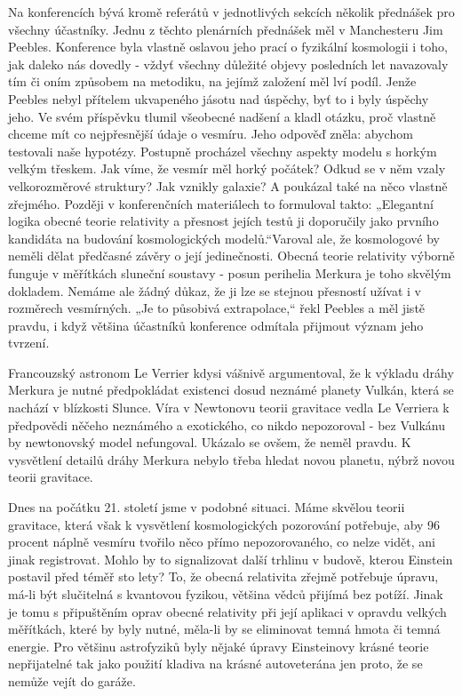   Na konferencích bývá kromě referátů v jednotlivých sekcích několik přednášek pro všechny
  účastníky. Jednu z těchto plenárních přednášek měl v Manchesteru Jim Peebles. Konference byla
  vlastně oslavou jeho prací o fyzikální kosmologii i toho, jak daleko nás dovedly - vždyť všechny
  důležité objevy posledních let navazovaly tím či oním způsobem na metodiku, na jejímž založení měl
  lví podíl. Jenže Peebles nebyl přítelem ukvapeného jásotu nad úspěchy, byť to i byly úspěchy jeho.
  Ve svém příspěvku tlumil všeobecné nadšení a kladl otázku, proč vlastně chceme mít co nejpřesnější
  údaje o vesmíru. Jeho odpověď zněla: abychom testovali naše hypotézy. Postupně procházel všechny
  aspekty modelu s horkým velkým třeskem. Jak víme, že vesmír měl horký počátek? Odkud se v něm
  vzaly velkorozměrové struktury? Jak vznikly galaxie? A poukázal také na něco vlastně zřejmého.
  Později v konferenčních materiálech to formuloval takto: „Elegantní logika obecné teorie
  relativity a přesnost jejích testů ji doporučily jako prvního kandidáta na budování kosmologických
  modelů.“Varoval ale, že kosmologové by neměli dělat předčasné závěry o její jedinečnosti. Obecná
  teorie relativity výborně funguje v měřítkách sluneční soustavy - posun perihelia Merkura je toho
  skvělým dokladem. Nemáme ale žádný důkaz, že ji lze se stejnou přesností užívat i v rozměrech
  vesmírných. „Je to působivá extrapolace,“ řekl Peebles a měl jistě pravdu, i když většina
  účastníků konference odmítala přijmout význam jeho tvrzení. 
  
  Francouzský astronom Le Verrier kdysi vášnivě argumentoval, že k výkladu dráhy Merkura je nutné
  předpokládat existenci dosud neznámé planety Vulkán, která se nachází v blízkosti Slunce. Víra v
  Newtonovu teorii gravitace vedla Le Verriera k předpovědi něčeho neznámého a exotického, co nikdo
  nepozoroval - bez Vulkánu by newtonovský model nefungoval. Ukázalo se ovšem, že neměl pravdu. K
  vysvětlení detailů dráhy Merkura nebylo třeba hledat novou planetu, nýbrž novou teorii gravitace.
  
  Dnes na počátku 21. století jsme v podobné situaci. Máme skvělou teorii gravitace, která však k
  vysvětlení kosmologických pozorování potřebuje, aby 96 procent náplně vesmíru tvořilo něco přímo
  nepozorovaného, co nelze vidět, ani jinak registrovat. Mohlo by to signalizovat další trhlinu v
  budově, kterou Einstein postavil před téměř sto lety? To, že obecná relativita zřejmě potřebuje
  úpravu, má-li být slučitelná s kvantovou fyzikou, většina vědců přijímá bez potíží. Jinak je tomu
  s připuštěním oprav obecné relativity při její aplikaci v opravdu velkých měřítkách, které by byly
  nutné, měla-li by se eliminovat temná hmota či temná energie. Pro většinu astrofyziků byly nějaké
  úpravy Einsteinovy krásné teorie nepřijatelné tak jako použití kladiva na krásné autoveterána jen
  proto, že se nemůže vejít do garáže.
  
